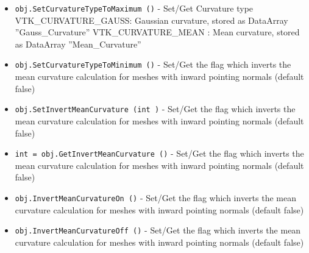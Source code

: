 \begin{itemize}
\item  \verb|obj.SetCurvatureTypeToMaximum ()| -  Set/Get Curvature type
 VTK\_CURVATURE\_GAUSS: Gaussian curvature, stored as
 DataArray ''Gauss\_Curvature''
 VTK\_CURVATURE\_MEAN : Mean curvature, stored as
 DataArray ''Mean\_Curvature''

\item  \verb|obj.SetCurvatureTypeToMinimum ()| -  Set/Get the flag which inverts the mean curvature calculation for
 meshes with inward pointing normals (default false)

\item  \verb|obj.SetInvertMeanCurvature (int )| -  Set/Get the flag which inverts the mean curvature calculation for
 meshes with inward pointing normals (default false)

\item  \verb|int = obj.GetInvertMeanCurvature ()| -  Set/Get the flag which inverts the mean curvature calculation for
 meshes with inward pointing normals (default false)

\item  \verb|obj.InvertMeanCurvatureOn ()| -  Set/Get the flag which inverts the mean curvature calculation for
 meshes with inward pointing normals (default false)

\item  \verb|obj.InvertMeanCurvatureOff ()| -  Set/Get the flag which inverts the mean curvature calculation for
 meshes with inward pointing normals (default false)

\end{itemize}
